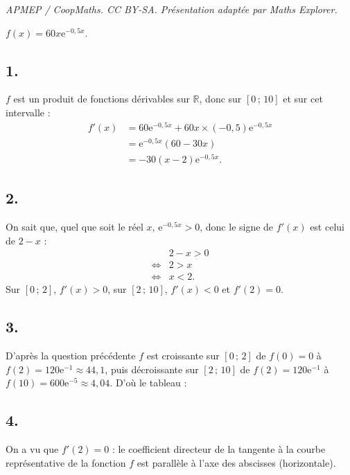 \documentclass[10pt]{article}
\providecommand{\e}{{\mathrm{e}}}
\begin{document}
\noindent\textit{APMEP / CoopMaths. CC BY-SA. Présentation adaptée par Maths Explorer.}\par\medskip
\(f(x) = 60x \e^{-0{,}5x}\).

\subsection*{1.}

\( f \) est un produit de fonctions dérivables sur \( \mathbb{R} \), donc sur \([0 \,;\, 10]\) et sur cet intervalle :
\begin{align*}
f'(x) &= 60\e^{-0{,}5x} + 60x \times (-0{,}5)\e^{-0{,}5x} \\
&= \e^{-0{,}5x}(60 - 30x) \\
&= -30(x - 2)\e^{-0{,}5x}.
\end{align*}

\subsection*{2.}

On sait que, quel que soit le réel \( x \), \( \e^{-0{,}5x} > 0 \), donc le signe de \( f'(x) \) est celui de \( 2 - x \) :
\begin{align*}
&2 - x > 0 \\
\iff &2 > x \\
\iff &x < 2.
\end{align*}
Sur \([0 \,;\, 2]\), \( f'(x) > 0 \), sur \([2 \,;\, 10]\), \( f'(x) < 0 \) et \( f'(2) = 0 \).

\subsection*{3.}

D'après la question précédente \( f \) est croissante sur \([0 \,;\, 2]\) de \( f(0) = 0 \) à \( f(2) = 120\e^{-1} \approx 44{,}1 \), puis décroissante sur \([2 \,;\, 10]\) de \( f(2) = 120\e^{-1} \) à \( f(10) = 600\e^{-5} \approx 4{,}04 \). D'où le tableau :

\begin{center}
\end{center}

\subsection*{4.}
On a vu que \( f'(2) = 0 \) : le coefficient directeur de la tangente à la courbe représentative de la fonction \( f \) est parallèle à l'axe des abscisses (horizontale).
\end{document}
